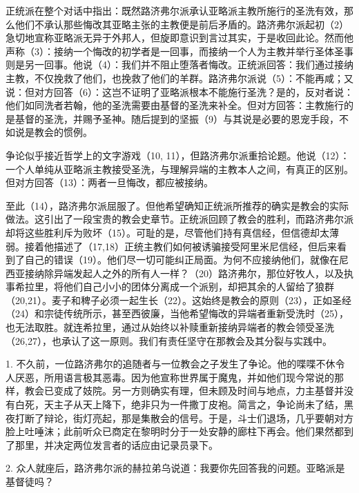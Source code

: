 正统派在整个对话中指出：既然路济弗尔派承认亚略派主教所施行的圣洗有效，那么他们不承认那些悔改其亚略主张的主教便是前后矛盾的。路济弗尔派起初（2）急切地宣称亚略派无异于外邦人，但旋即意识到言过其实，于是收回此论。然而他声称（3）：接纳一个悔改的初学者是一回事，而接纳一个人为主教并举行圣体圣事则是另一回事。他说（4）：我们并不阻止堕落者悔改。正统派回答：我们通过接纳主教，不仅挽救了他们，也挽救了他们的羊群。路济弗尔派说（5）：不能再咸；又说：但对方回答（6）：这岂不证明了亚略派根本不能施行圣洗？是的，反对者说：他们如同洗者若翰，他的圣洗需要由基督的圣洗来补全。但对方回答：主教施行的是基督的圣洗，并赐予圣神。随后提到的坚振（9）与其说是必要的恩宠手段，不如说是教会的惯例。\par

争论似乎接近哲学上的文字游戏（10, 11），但路济弗尔派重拾论题。他说（12）：一个人单纯从亚略派主教接受圣洗，与理解异端的主教本人之间，有真正的区别。但对方回答（13）：两者一旦悔改，都应被接纳。\par

至此（14），路济弗尔派屈服了。但他希望确知正统派所推荐的确实是教会的实际做法。这引出了一段宝贵的教会史章节。正统派回顾了教会的胜利，而路济弗尔派却将这些胜利斥为败坏（15）。可耻的是，尽管他们持有真信经，但信德却太薄弱。接着他描述了（17,18）正统主教们如何被诱骗接受阿里米尼信经，但后来看到了自己的错误（19）。他们尽一切可能纠正局面。为何不应接纳他们，就像在尼西亚接纳除异端发起人之外的所有人一样？（20）路济弗尔，那位好牧人，以及执事希拉里，将他们自己小小的团体分离成一个派别，却把其余的人留给了狼群（20,21）。麦子和稗子必须一起生长（22）。这始终是教会的原则（23），正如圣经（24）和宗徒传统所示，甚至西彼廉，当他希望悔改的异端者重新受洗时（25），也无法取胜。就连希拉里，通过从始终以补赎重新接纳异端者的教会领受圣洗（26,27），也承认了这一原则。我们有责任坚守在那教会及其分裂与实践中。\par

1. 不久前，一位路济弗尔的追随者与一位教会之子发生了争论。他的喋喋不休令人厌恶，所用语言极其恶毒。因为他宣称世界属于魔鬼，并如他们现今常说的那样，教会已变成了妓院。另一方则确实有理，但未顾及时间与地点，力主基督并没有白死，天主子从天上降下，绝非只为一件撒丁皮袍。简言之，争论尚未了结，黑夜打断了辩论，街灯亮起，那是集散会的信号。于是，斗士们退场，几乎要朝对方脸上吐唾沫；此前听众已商定在黎明时分于一处安静的廊柱下再会。他们果然都到了那里，并决定两位发言者的话应由记录员录下。\par

2. 众人就座后，路济弗尔派的赫拉弟乌说道：我要你先回答我的问题。亚略派是基督徒吗？\par

